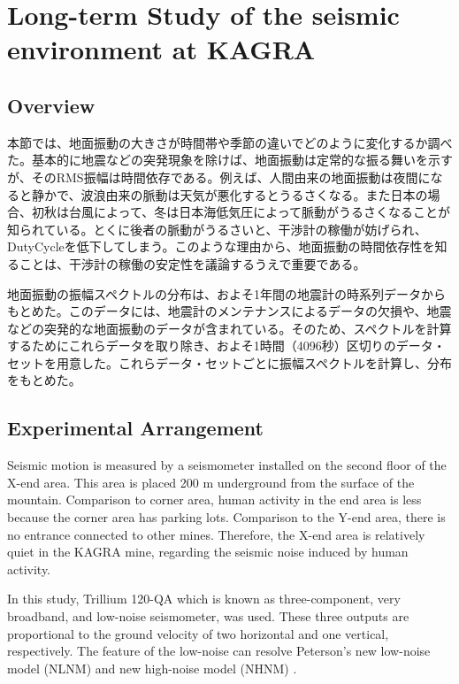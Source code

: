 \newpage
\section{Long-term Study of the seismic environment at KAGRA}
\subsection{Overview}
本節では、地面振動の大きさが時間帯や季節の違いでどのように変化するか調べた。基本的に地震などの突発現象を除けば、地面振動は定常的な振る舞いを示すが、そのRMS振幅は時間依存である。例えば、人間由来の地面振動は夜間になると静かで、波浪由来の脈動は天気が悪化するとうるさくなる。また日本の場合、初秋は台風によって、冬は日本海低気圧によって脈動がうるさくなることが知られている\cite{}。とくに後者の脈動がうるさいと、干渉計の稼働が妨げられ、DutyCycleを低下してしまう。このような理由から、地面振動の時間依存性を知ることは、干渉計の稼働の安定性を議論するうえで重要である。

地面振動の振幅スペクトルの分布は、およそ1年間の地震計の時系列データからもとめた。このデータには、地震計のメンテナンスによるデータの欠損や、地震などの突発的な地面振動のデータが含まれている。そのため、スペクトルを計算するためにこれらデータを取り除き、およそ1時間（4096秒）区切りのデータ・セットを用意した。これらデータ・セットごとに振幅スペクトルを計算し、分布をもとめた。

\subsection{Experimental Arrangement}
Seismic motion is measured by a seismometer installed on the second floor of the X-end area. This area is placed 200 $\mathrm{m}$ underground from the surface of the mountain. Comparison to corner area, human activity in the end area is less because the corner area has parking lots. Comparison to the Y-end area, there is no entrance connected to other mines. Therefore, the X-end area is relatively quiet in the KAGRA mine, regarding the seismic noise induced by human activity.

In this study, Trillium 120-QA which is known as three-component, very broadband, and low-noise seismometer, was used. These three outputs are proportional to the ground velocity of two horizontal and one vertical, respectively. The feature of the low-noise can resolve  Peterson's new low-noise model (NLNM) and new high-noise model (NHNM) \cite{peterson1993observations}.

